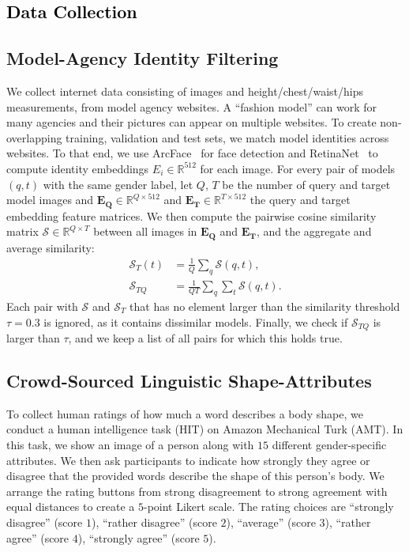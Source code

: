 \documentclass[10pt,twocolumn,letterpaper]{article}
\newcommand{\retinanet}{\mbox{RetinaNet}\xspace}
\newcommand{\arcface}{\mbox{ArcFace}\xspace}
\newcommand{\amt}{\mbox{AMT}\xspace}
\newcommand{\cameraready}[1]{\textcolor{Fuchsia}{{#1}}\xspace}
\renewcommand{\cameraready}[1]{\textcolor{black}{{#1}}\xspace}
\begin{document}
\begin{appendices}
    \renewcommand{\thefigure}{A.\arabic{figure}}
    \setcounter{figure}{0}
    \renewcommand{\thetable}{A.\arabic{table}}
    \setcounter{table}{0}

    







\section{\cameraready{Data Collection}}
\subsection{Model-Agency Identity Filtering}
\label{supmat:sec:model_images}

We collect internet data consisting of images and height/chest/waist/hips measurements, from model agency websites.
A ``fashion model'' can work for many agencies and their pictures can appear on multiple websites.
To create non-overlapping training, validation and test sets, we match model identities across websites.
To that end, we use \arcface~\cite{deng2018arcface} for face detection and \retinanet~\cite{Deng_2020_CVPR} to compute identity embeddings $E_i \in \mathbb{R}^{512}$ for each image.
For every pair of models $(q, t)$ with the same gender label, let $Q$, $T$ be the number of query and target model images and $\bm{E_Q} \in \mathbb{R}^{Q \times 512}$ and $\bm{E_T} \in \mathbb{R}^{T \times 512}$ the query and target embedding feature matrices.
We then compute the pairwise cosine similarity matrix $\mathcal{S} \in \mathbb{R}^{Q \times T}$ between all images in $\bm{E_Q}$ and $\bm{E_T}$, and the aggregate and average similarity:
\begin{align}
    \mathcal{S}_T(t) & = \frac{1}{Q}  \sum_q        \mathcal{S}(q, t), \\
    \mathcal{S}_{TQ} & = \frac{1}{QT} \sum_q \sum_t \mathcal{S}(q, t).
\end{align}
Each pair with $\mathcal{S}$ and $\mathcal{S}_T$ that has no element larger than the similarity threshold $\tau=0.3$ is ignored, as it contains dissimilar models.
Finally, we check if $\mathcal{S}_{TQ}$ is larger than $\tau$, and we keep a list of all pairs for which this holds true.
 \subsection{Crowd-Sourced Linguistic Shape-Attributes}
To collect human ratings of how much a word describes a body shape, we conduct a
human intelligence task (HIT)
on Amazon Mechanical Turk (\amt). 
In this task, we show an image of a person along with $15$ different gender-specific attributes. 
We then ask participants to indicate how strongly they agree or disagree that the provided words describe the shape of this person's body. 
We arrange the rating buttons from strong disagreement to strong agreement with equal distances to create a $5$-point Likert scale. 
The rating choices are ``strongly disagree'' (score $1$), ``rather disagree'' (score $2$), ``average'' (score $3$), ``rather agree'' (score $4$), ``strongly agree'' (score $5$). 



\end{appendices}
\end{document}

